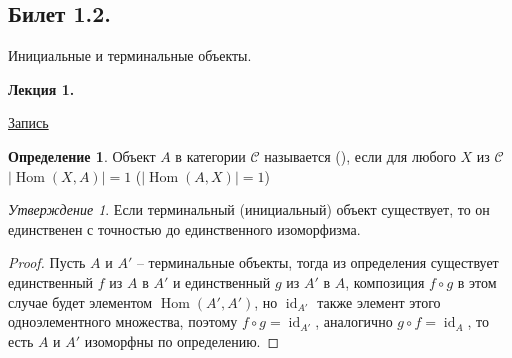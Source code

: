 \documentclass[a4paper]{article}
\newcommand{\mybox}{%
    \collectbox{%
        \setlength{\fboxsep}{1pt}%
        \fbox{\BOXCONTENT}%
    }%
}
\theoremstyle{indented}
\theoremstyle{definition}
\newtheorem{defn}{Определение}
\theoremstyle{remark}
\newtheorem{stat}{Утверждение}
\DeclareMathOperator{\id}{id}
\DeclareMathOperator{\Hom}{Hom}
\begin{document}
\newpage

\subsection{Билет 1.2.}

Инициальные и терминальные объекты.  

\hrulefill

\textbf{Лекция 1.} 

\begin{flushright}
    \mybox{
        \href{https://disk.yandex.ru/d/knoQ44wLmGDwwQ/2021-2022%20учебный%20год%20(осенний%20семестр)/2%20курс/Теоретическая%20информатика/Теор%20информатика%2C%20лекция%2C%2001.09.2021.mp4}{Запись}
    }
\end{flushright}

\begin{defn}
    Объект $A$ в категории $\mathcal{C}$ называется  (), если для любого $X$ из $\mathcal{C}$ $\vert \Hom (X, A)\vert=1$ ($\vert \Hom (A, X)\vert=1$)
\end{defn}

\begin{stat}
    Если терминальный (инициальный) объект существует, то он единственен с точностью до единственного изоморфизма.
\end{stat}

\begin{proof}
    Пусть $A$ и $A'$ -- терминальные объекты, тогда из определения существует единственный $f$ из $A$ в $A'$ и единственный $g$ из $A'$ в $A$, композиция $f\circ g$ в этом случае будет элементом $\Hom (A', A')$, но $\id_{A'}$ также элемент этого одноэлементного множества, поэтому $f\circ g = \id_{A'}$, аналогично $g\circ f = \id_{A}$, то есть $A$ и $A'$ изоморфны по определению.
\end{proof}
\end{document}
